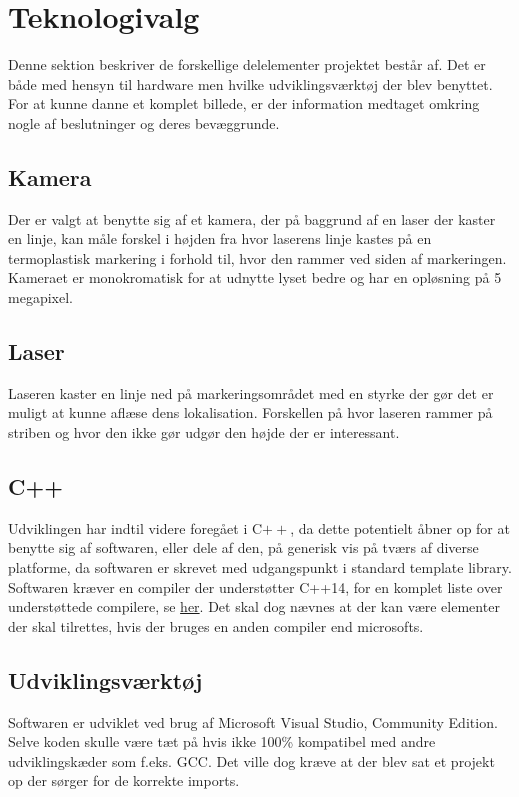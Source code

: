 \section{Teknologivalg}
Denne sektion beskriver de forskellige delelementer projektet består af. Det er både med hensyn til hardware men hvilke udviklingsværktøj der blev benyttet. For at kunne danne et komplet billede, er der information medtaget omkring nogle af beslutninger og deres bevæggrunde. 

\subsection{Kamera}
Der er valgt at benytte sig af et kamera, der på baggrund af en laser der kaster en linje, kan måle forskel i højden fra hvor laserens linje kastes på en termoplastisk markering i forhold til, hvor den rammer ved siden af markeringen.
Kameraet er monokromatisk for at udnytte lyset bedre og har en opløsning på 5 megapixel.

\subsection{Laser}
Laseren kaster en linje ned på markeringsområdet med en styrke der gør det er muligt at kunne aflæse dens lokalisation. Forskellen på hvor laseren rammer på striben og hvor den ikke gør udgør den højde der er interessant.

\subsection{C++}
Udviklingen har indtil videre foregået i C$++$, da dette potentielt åbner op for at benytte sig af softwaren, eller dele af den, på generisk vis på tværs af diverse platforme, da softwaren er skrevet med udgangspunkt i standard template library.
Softwaren kræver en compiler der understøtter C++14, for en komplet liste over understøttede compilere, se \href{http://en.cppreference.com/w/cpp/compiler_support}{her}. Det skal dog nævnes at der kan være elementer der skal tilrettes, hvis der bruges en anden compiler end microsofts.

\subsection{Udviklingsværktøj}
Softwaren er udviklet ved brug af Microsoft Visual Studio, Community Edition. Selve koden skulle være tæt på hvis ikke 100\% kompatibel med andre udviklingskæder som f.eks. GCC. Det ville dog kræve at der blev sat et projekt op der sørger for de korrekte imports.

